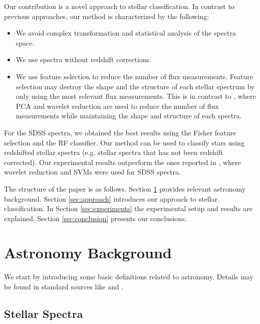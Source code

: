 \documentclass[conference]{IEEEtran}
\begin{document}
Our contribution is a novel approach to stellar classification. In contrast to previous approaches, our method is characterized by the following:

\begin{itemize}
	\item We avoid complex transformation and statistical analysis of the spectra space.
	\item We use spectra without redshift corrections.
	\item We use feature selection to reduce the number of flux measurements. Feature selection may destroy the shape and the structure of each stellar spectrum by only using the most relevant flux measurements. This is in contrast to \cite{Xing}, where PCA and wavelet reduction are used to reduce the number of flux measurements while maintaining the shape and structure of each spectra. 
\end{itemize}

For the SDSS spectra, we obtained the best results using the Fisher feature selection and the RF classifier. Our method can be used to classify stars using redshifted stellar spectra (e.g. stellar spectra that has not been redshift corrected). Our experimental results outperform the ones reported in \cite{Xing}, where wavelet reduction and SVMs were used for SDSS spectra.

The structure of the paper is as follows. Section \ref{sec:astro} provides relevant astronomy background. Section \ref{sec:approach} introduces our approach to stellar classification. In Section \ref{sec:experiments} the experimental setup and results are explained. Section \ref{sec:conclusion} presents our conclusions.

\section{Astronomy Background}\label{sec:astro}

	We start by introducing some basic definitions related to astronomy. Details may be found in standard sources like \cite{Carroll} and \cite{Chromey}. 

	\subsection{Stellar Spectra} \label{sec:spectra}
\end{document}
